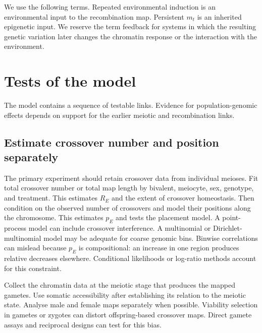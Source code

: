 \documentclass[11pt]{article}
\theoremstyle{remark}
\begin{document}
We use the following terms. Repeated environmental induction is an
environmental input to the recombination map. Persistent $m_t$ is an inherited
epigenetic input. We reserve the term feedback for systems in which the resulting
genetic variation later changes the chromatin response or the interaction with the
environment.

\section{Tests of the model}
\label{sec:predictions}

The model contains a sequence of testable links. Evidence for population-genomic
effects depends on support for the earlier meiotic and recombination links.



\subsection{Estimate crossover number and position separately}

The primary experiment should retain crossover data from individual meioses. Fit
total crossover number or total map length by bivalent, meiocyte, sex, genotype,
and treatment. This estimates $R_E$ and the extent of crossover homeostasis. Then
condition on the observed number of crossovers and model their positions along the
chromosome. This estimates $p_E$ and tests the placement model. A point-process
model can include crossover interference. A multinomial or Dirichlet-multinomial
model may be adequate for coarse genomic bins. Binwise correlations can mislead
because $p_E$ is compositional: an increase in one region produces relative
decreases elsewhere. Conditional likelihoods or log-ratio methods account for
this constraint.

Collect the chromatin data at the meiotic stage that produces the mapped gametes.
Use somatic accessibility after establishing its relation to the meiotic state. Analyse male and female maps separately when possible. Viability
selection in gametes or zygotes can distort offspring-based crossover maps. Direct
gamete assays and reciprocal designs can test for this bias.
\end{document}
